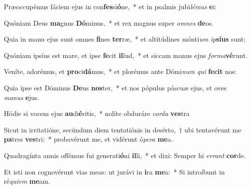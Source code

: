 \item Præoccupémus fáciem ejus in con\textbf{fes}si\textbf{ó}ne,~* et in psalmis jubi\textit{lé}\textit{mus} \textbf{e}i:
\item Quóniam Deus \textbf{ma}gnus \textbf{Dó}minus,~* et rex magnus super \textit{om}\textit{nes} \textbf{de}os.
\item Quia in manu ejus sunt omnes \textbf{fi}nes \textbf{ter}ræ,~* et altitúdines mónti\textit{um} \textit{ip}\textbf{sí}\textbf{us} sunt;
\item Quóniam ipsíus est mare, et ipse \textbf{fe}cit \textbf{il}lud,~* et siccam manus ejus \textit{for}\textit{ma}\textbf{vé}runt.
\item Veníte, adorémus, et \textbf{pro}ci\textbf{dá}mus,~* et plorémus ante Dómi\textit{num} \textit{qui} \textbf{fe}\textbf{cit} nos:
\item Quia ipse est Dóminus \textbf{De}us \textbf{nos}ter,~* et nos pópulus páscuæ ejus, et oves \textit{ma}\textit{nus} \textbf{e}jus.
\item Hódie si vocem ejus \textbf{au}di\textbf{é}ritis,~* nolíte obduráre \textit{cor}\textit{da} \textbf{ves}tra
\item Sicut in irritatióne, secúndum diem tentatiónis in desérto,~† ubi tentavérunt me \textbf{pa}tres \textbf{ves}tri:~* probavérunt me, et vidérunt ó\textit{pe}\textit{ra} \textbf{me}a.
\item Quadragínta annis offénsus fui generati\textbf{ó}ni \textbf{il}li,~* et dixi: Semper hi \textit{er}\textit{rant} \textbf{cor}de.
\item Et isti non cognovérunt vias meas: ut jurávi in \textbf{i}ra \textbf{me}a:~* Si introíbunt in ré\textit{qui}\textit{em} \textbf{me}am.
